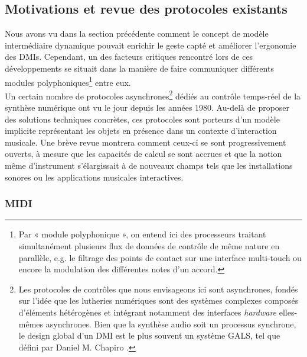 \subsection{Motivations et revue des protocoles existants}

\noindent Nous avons vu dans la section précédente comment le concept de modèle intermédiaire dynamique pouvait enrichir le geste capté et améliorer l’ergonomie des \glspl{DMI}. Cependant, un des facteurs critiques rencontré lors de ces développements se situait dans la manière de faire communiquer différents modules polyphoniques\footnote{Par « module polyphonique », on entend ici des processeurs traitant simultanément plusieurs flux de données de contrôle de même nature en parallèle, e.g. le filtrage des points de contact sur une interface multi-touch ou encore la modulation des différentes notes d'un accord.} entre eux.\\
\indent Un certain nombre de protocoles asynchrones\footnote{Les protocoles de contrôles que nous envisageons ici sont asynchrones, fondés sur l’idée que les lutheries numériques sont des systèmes complexes composés d’éléments hétérogènes et intégrant notamment des interfaces \textit{hardware} elles-mêmes asynchrones. Bien que la synthèse audio soit un processus synchrone, le design global d'un \gls{DMI} est le plus souvent un système \gls{GALS}, tel que défini par Daniel M. Chapiro \cite{chapiro_globally-asynchronous_1984}.} dédiés au contrôle temps-réel de la synthèse numérique ont vu le jour depuis les années 1980. Au-delà de proposer des solutions techniques concrètes, ces protocoles sont porteurs d’un modèle implicite représentant les objets en présence dans un contexte d'interaction musicale. Une brève revue montrera comment ceux-ci se sont progressivement ouverts, à mesure que les capacités de calcul se sont accrues et que la notion même d’instrument s’élargissait à de nouveaux champs tels que les installations sonores ou les applications musicales interactives.

\subsubsection{MIDI}

